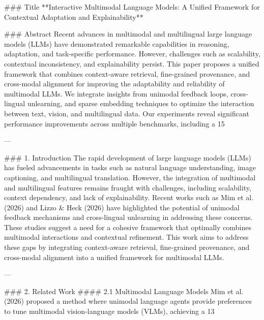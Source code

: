 ### Title  
**Interactive Multimodal Language Models: A Unified Framework for Contextual Adaptation and Explainability**

### Abstract  
Recent advances in multimodal and multilingual large language models (LLMs) have demonstrated remarkable capabilities in reasoning, adaptation, and task-specific performance. However, challenges such as scalability, contextual inconsistency, and explainability persist. This paper proposes a unified framework that combines context-aware retrieval, fine-grained provenance, and cross-modal alignment for improving the adaptability and reliability of multimodal LLMs. We integrate insights from unimodal feedback loops, cross-lingual unlearning, and sparse embedding techniques to optimize the interaction between text, vision, and multilingual data. Our experiments reveal significant performance improvements across multiple benchmarks, including a 15%

---

### 1. Introduction  
The rapid development of large language models (LLMs) has fueled advancements in tasks such as natural language understanding, image captioning, and multilingual translation. However, the integration of multimodal and multilingual features remains fraught with challenges, including scalability, context dependency, and lack of explainability. Recent works such as Mim et al. (2026) and Lizzo & Heck (2026) have highlighted the potential of unimodal feedback mechanisms and cross-lingual unlearning in addressing these concerns. These studies suggest a need for a cohesive framework that optimally combines multimodal interactions and contextual refinement. This work aims to address these gaps by integrating context-aware retrieval, fine-grained provenance, and cross-modal alignment into a unified framework for multimodal LLMs.

---

### 2. Related Work  
#### 2.1 Multimodal Language Models  
Mim et al. (2026) proposed a method where unimodal language agents provide preferences to tune multimodal vision-language models (VLMs), achieving a 13%


